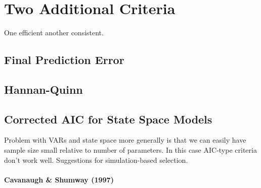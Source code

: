 \documentclass[12pt]{article}
\theoremstyle{definition}
\begin{document}
\section{Two Additional Criteria}
One efficient another consistent.
\subsection{Final Prediction Error}

\subsection{Hannan-Quinn}


\subsection{Corrected AIC for State Space Models}
Problem with VARs and state space more generally is that we can easily have sample size small relative to number of parameters. In this case AIC-type criteria don't work well. Suggestions for simulation-based selection.

\paragraph{Cavanaugh \& Shumway (1997)} 
\end{document}
